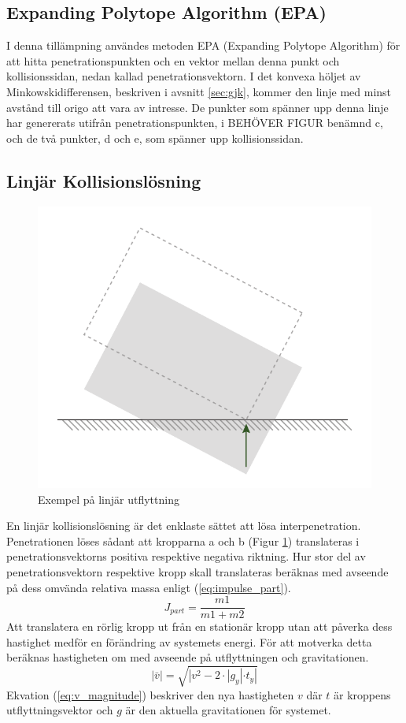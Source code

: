 \documentclass[a4paper,12pt,twopage,swedish]{article}
\begin{document}
	\subsection{Expanding Polytope Algorithm (EPA)}
		I denna tillämpning användes metoden EPA (Expanding Polytope Algorithm) för att hitta penetrationspunkten och en vektor mellan denna punkt och kollisionssidan, nedan kallad penetrationsvektorn. I det konvexa höljet av Minkowskidifferensen, beskriven i avsnitt \ref{sec:gjk}, kommer den linje med minst avstånd till origo att vara av intresse. De punkter som spänner upp denna linje har genererats utifrån penetrationspunkten, i  BEHÖVER FIGUR benämnd c, och de två punkter, d och e, som spänner upp kollisionssidan.
	\subsection{Linjär Kollisionslösning}
		\begin{figure}[!h]
			\centering
			\includegraphics{illustrations/linear.pdf}
			\caption{Exempel på linjär utflyttning}
			\label{fig:linear}
		\end{figure}
		En linjär kollisionslösning är det enklaste sättet att lösa interpenetration. Penetrationen löses sådant att kropparna a och b (Figur \ref{fig:linear}) translateras i penetrationsvektorns positiva respektive negativa riktning. Hur stor del av penetrationsvektorn respektive kropp skall translateras beräknas med avseende på dess omvända relativa massa enligt (\ref{eq:impulse_part}).
		\begin{equation}\label{eq:impulse_part}
			J_{part} = \frac{m1}{m1+m2}
		\end{equation}
		Att translatera en rörlig kropp ut från en stationär kropp utan att påverka dess hastighet medför en förändring av systemets energi. För att motverka detta beräknas hastigheten om med avseende på utflyttningen och gravitationen.
		\begin{equation}\label{eq:v_magnitude}
			|\bar{v}| = \sqrt{|v^{2}-2\cdot|g_y| \cdot t_y|}
		\end{equation}
		Ekvation (\ref{eq:v_magnitude}) beskriver den nya hastigheten $v$ där $t$ är kroppens utflyttningsvektor och $g$ är den aktuella gravitationen för systemet.
\end{document}
